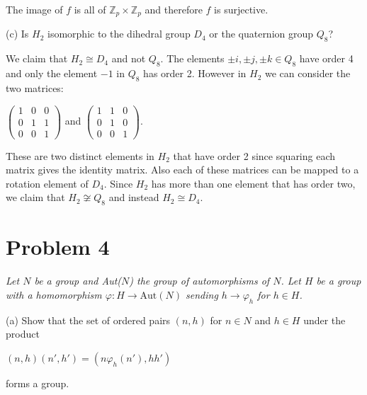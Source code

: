 \documentclass{article}
\theoremstyle{plain} %
\theoremstyle{definition} %
\newcommand{\bZ}{\mathbb{Z}}
\begin{document}
The image of $f$ is all of $\bZ_p \times \bZ_p$ and therefore $f$ is surjective.

\noindent (c) Is $H_2$ isomorphic to the dihedral group $D_4$ or the quaternion group $Q_8$?

We claim that $H_2 \cong D_4$ and not $Q_8$. The elements $\pm i, \pm j, \pm k \in Q_8$ have order 4 and only the
element $-1$ in $Q_8$ has order 2. However in $H_2$ we can consider the two matrices:
\begin{center}
    $\begin{pmatrix}
        1 & 0 & 0 \\
        0 & 1 & 1 \\
        0 & 0 & 1
    \end{pmatrix}$ and 
    $\begin{pmatrix}
        1 & 1 & 0 \\
        0 & 1 & 0 \\
        0 & 0 & 1
    \end{pmatrix}$.
\end{center}
These are two distinct elements in $H_2$ that have order 2 since squaring each matrix
gives the identity matrix. Also each of these matrices
can be mapped to a rotation element of $D_4$. Since $H_2$ has more than one
element that has order two, we claim that $H_2 \not \cong Q_8$ and instead
$H_2 \cong D_4$.

\section*{Problem 4}
\noindent \textit{Let $N$ be a group and Aut($N$) the group of automorphisms of $N$. Let $H$ be a group with a homomorphism $
\varphi: H \to \text{Aut}(N)$ sending $h \to \varphi_h$ for $h \in H$.}

\noindent (a) Show that the set of ordered pairs $(n, h)$ for $n \in N$ and $h \in H$ under the product
\begin{center}
    $(n,h)(n',h') = (n\varphi_h(n'), hh')$
\end{center}
forms a group.
\end{document}
